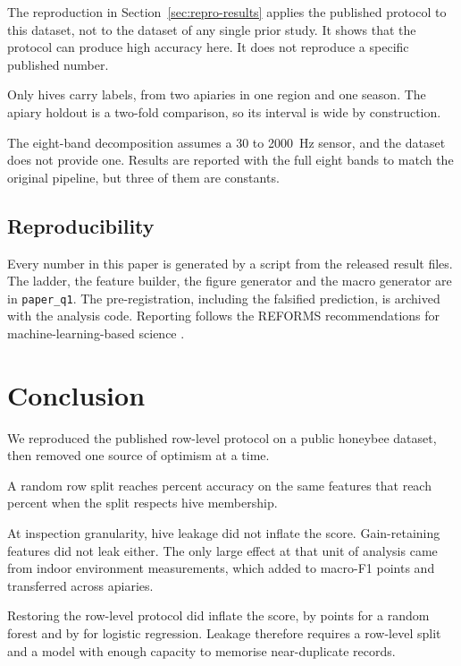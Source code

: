 ﻿\documentclass[review,12pt]{elsarticle}
\begin{document}
The reproduction in Section~\ref{sec:repro-results} applies the published
protocol to this dataset, not to the dataset of any single prior study.
It shows that the protocol can produce high accuracy here.
It does not reproduce a specific published number.

Only \LeakNHives{} hives carry labels, from two apiaries in one region and one season.
The apiary holdout is a two-fold comparison, so its interval is wide by
construction.

The eight-band decomposition assumes a
\SI{30}{} to \SI{2000}{\hertz} sensor, and the dataset does not provide one.
Results are reported with the full eight bands to match the original pipeline,
but three of them are constants.

\subsection{Reproducibility}

Every number in this paper is generated by a script from the released result
files.
The ladder, the feature builder, the figure generator and the macro generator
are in \texttt{paper\_q1}.
The pre-registration, including the falsified prediction, is archived with the
analysis code.
Reporting follows the REFORMS recommendations for machine-learning-based
science \cite{kapoor2024reforms}.

\section{Conclusion}

We reproduced the published row-level protocol on a public honeybee dataset,
then removed one source of optimism at a time.

A random row split reaches \LeakReproBestAAccuracy{} percent accuracy on the
same features that reach \LeakReproBestBAccuracy{} percent when the split
respects hive membership.

At inspection granularity, hive leakage did not inflate the score.
Gain-retaining features did not leak either.
The only large effect at that unit of analysis came from indoor environment
measurements, which added \LeakEnvGainMinPts{} to \LeakEnvGainMaxPts{}
macro-F1 points and transferred across apiaries.

Restoring the row-level protocol did inflate the score, by
\LeakRowsGapRandomForestPts{} points for a random forest and by
\LeakRowsGapLogisticRegressionPts{} for logistic regression.
Leakage therefore requires a row-level split and a model with enough capacity
to memorise near-duplicate records.
\end{document}
